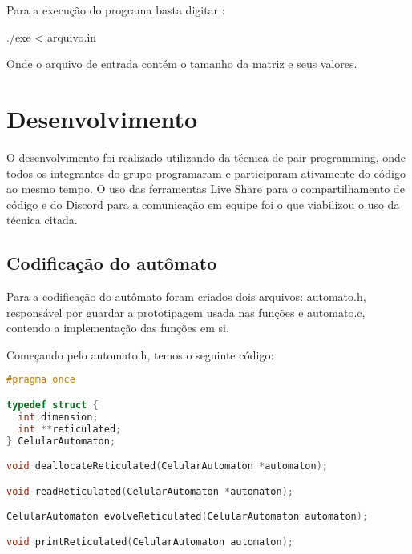 \documentclass{article}
\begin{document}
Para a execução do programa basta digitar :
\begin{tcolorbox}[title=,width=\linewidth]
    ./exe \textless{}  arquivo.in
\end{tcolorbox}

Onde o arquivo de entrada contém o tamanho da matriz e seus valores.

\clearpage
\section{Desenvolvimento}
\DESCRICAO{}
O desenvolvimento foi realizado utilizando da técnica de pair programming, onde todos os integrantes do grupo programaram e participaram ativamente do código ao mesmo tempo. O uso das ferramentas Live Share para o compartilhamento de código e do Discord para a comunicação em equipe foi o que viabilizou o uso da técnica citada.

\subsection{Codificação do autômato}
\DESCRICAO{} 
Para a codificação do autômato foram criados dois arquivos: automato.h, responsável por guardar a prototipagem usada nas funções e automato.c, contendo a implementação das funções em si.
\hfill\break

\noindent Começando pelo automato.h, temos o seguinte código:

\begin{lstlisting}[caption={Headers do autômato.},label={lst:cod1},language=C]
#pragma once

typedef struct {
  int dimension;
  int **reticulated;
} CelularAutomaton;

void deallocateReticulated(CelularAutomaton *automaton);

void readReticulated(CelularAutomaton *automaton);

CelularAutomaton evolveReticulated(CelularAutomaton automaton);

void printReticulated(CelularAutomaton automaton);
 \end{lstlisting}
 
\end{document}
